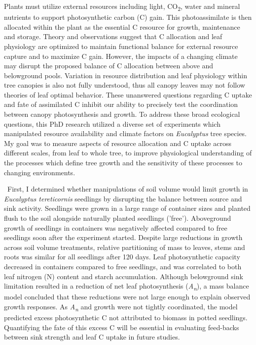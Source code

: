 \documentclass[a4paper]{article}\usepackage[]{graphicx}\usepackage[]{color}
\begin{document}
Plants must utilize external resources including light, CO\textsubscript{2}, water and mineral nutrients to support photosynthetic carbon (C) gain.  This photoassimilate is then allocated within the plant as the essential C resource for growth, maintenance and storage. Theory and observations suggest that C allocation and leaf physiology are optimized to maintain functional balance for external resource capture and to maximize C gain. However, the impacts of a changing climate may disrupt the proposed balance of C allocation between above and belowground pools. Variation in resource distribution and leaf physiology within tree canopies is also not fully understood, thus all canopy leaves may not follow theories of leaf optimal behavior. These unanswered questions regarding C uptake and fate of assimilated C inhibit our ability to precisely test the coordination between canopy photosynthesis and growth. To address these broad ecological questions, this PhD research utilized a diverse set of experiments which manipulated resource availability and climate factors on \textit{Eucalyptus} tree species. My goal was to measure aspects of resource allocation and C uptake across different scales, from leaf to whole tree, to improve physiological understanding of the processes which define tree growth and the sensitivity of these processes to changing environments.

\
First, I determined whether manipulations of soil volume would limit growth in \textit{Eucalyptus tereticornis} seedlings by disrupting the balance between source and sink activity. Seedlings were grown in a large range of container sizes and planted flush to the soil alongside naturally planted seedlings ('free'). Aboveground growth of seedlings in containers was negatively affected compared to free seedlings soon after the experiment started. Despite large reductions in growth across soil volume treatments, relative partitioning of mass to leaves, stems and roots was similar for all seedlings after 120 days. Leaf photosynthetic capacity decreased in containers compared to free seedlings, and was correlated to both leaf nitrogen (N) content and starch accumulation. Although belowground sink limitation resulted in a reduction of net leaf photosynthesis (\textit{A\textsubscript{n}}), a mass balance model concluded that these reductions were not large enough to explain observed growth responses. As \textit{A\textsubscript{n}} and growth were not tightly coordinated, the model predicted excess photosynthetic C not attributed to biomass in potted seedlings. Quantifying the fate of this excess C will be essential in evaluating feed-backs between sink strength and leaf C uptake in future studies.
\end{document}
